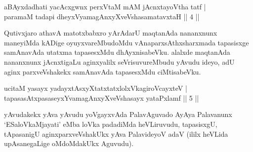 \begin{shl}
aBAyxdadhati yacAcxgwnx perxVtaM mAM jAcnxtayoV\s tha tatf | \\
paramaM tadapi dheyxVyamagAnxyXveVshasamatavxtaH \hfill ||  4 || 
\end{shl}

\begin{artha}
Qutivxjaro athavA matotxbabxro yArAdarU maqtanAda nananxnunx maneyiMda kADige oyuyxvareMbudoMdu vAnaparxsAthxsharxmada tapasisxge samAnavAda utatxma tapasesxMdu dhAyxnisabeVku. alalxde maqtanAda nananxnunx jAcnxtigaLu aginxyalilx seVrisuvureMbudu yAvudu ideyo, adU aginx parxveVshakekx samAnavAda tapasesxMdu ciMtisabeVku.
\end{artha}

\begin{shl}
ucitaM yasayx yadayxtAsxyXtatxtatxlolxVkagiroVcayxteV | \\
tapasasAtxpasaseyxYvamagAnxyXveVshasayx yataPxlamf \hfill ||  5 || 
\end{shl}

\begin{artha}
yAvudakekx yAva yAvudu yoVgayxvAda PalavAguvado AyAya Palavanunx `ESaloVkaMjayati' eMba loVka padadiMda heVLiruvudu, tapasisxgU, tApasanigU aginxparxveVshakUkx yAva PalavideyoV adaV (ililx heVLida upAsanegaLige oMdoMdakUkx Aguvudu).
\end{artha}

\centerline{}
